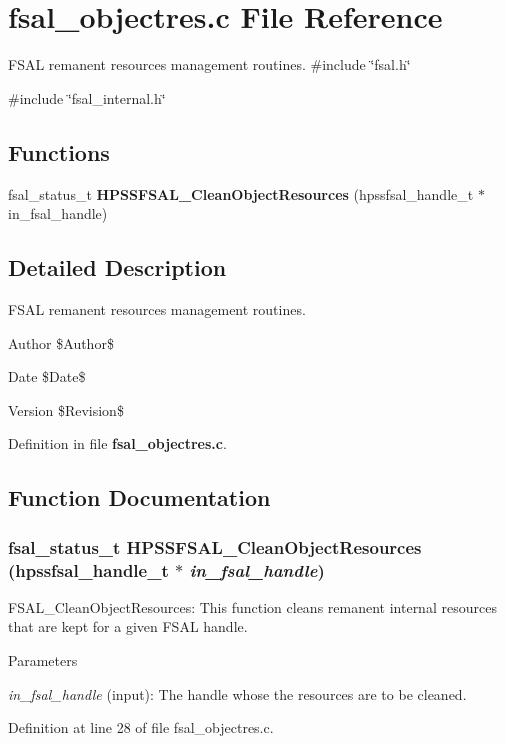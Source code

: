 \section{fsal\_\-objectres.c File Reference}
\label{fsal__objectres_8c}


FSAL remanent resources management routines.  
{\ttfamily \#include \char`\"{}fsal.h\char`\"{}}\par
{\ttfamily \#include \char`\"{}fsal\_\-internal.h\char`\"{}}\par
\subsection*{Functions}
\begin{DoxyCompactItemize}
\item 
fsal\_\-status\_\-t {\bf HPSSFSAL\_\-CleanObjectResources} (hpssfsal\_\-handle\_\-t $\ast$in\_\-fsal\_\-handle)
\end{DoxyCompactItemize}


\subsection{Detailed Description}
FSAL remanent resources management routines. \begin{DoxyAuthor}{Author}
\$Author\$ 
\end{DoxyAuthor}
\begin{DoxyDate}{Date}
\$Date\$ 
\end{DoxyDate}
\begin{DoxyVersion}{Version}
\$Revision\$ 
\end{DoxyVersion}


Definition in file {\bf fsal\_\-objectres.c}.

\subsection{Function Documentation}
\subsubsection[{HPSSFSAL\_\-CleanObjectResources}]{\setlength{\rightskip}{0pt plus 5cm}fsal\_\-status\_\-t HPSSFSAL\_\-CleanObjectResources (hpssfsal\_\-handle\_\-t $\ast$ {\em in\_\-fsal\_\-handle})}\label{fsal__objectres_8c_a7c50b8ff32c934e7666fd805541886e5}
FSAL\_\-CleanObjectResources: This function cleans remanent internal resources that are kept for a given FSAL handle.


\begin{DoxyParams}{Parameters}
\item[{\em in\_\-fsal\_\-handle}](input): The handle whose the resources are to be cleaned. \end{DoxyParams}


Definition at line 28 of file fsal\_\-objectres.c.